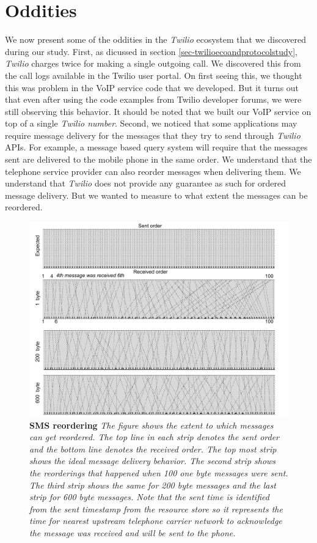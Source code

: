 \section{Oddities}
\label{sec-oddities}

We now present some of the oddities in the \textit{Twilio} ecosystem that we discovered during our study. First, as dicussed in section \ref{sec-twilioecoandprotocolstudy}, \textit{Twilio} charges twice for making a single outgoing call. We discovered this from the call logs available in the Twilio user portal. On first seeing this, we thought this was problem in the VoIP service code that we developed. But it turns out that even after using the code examples from Twilio developer forums, we were still observing this behavior. It should be noted that we built our VoIP service on top of a single \textit{Twilio number}. Second, we noticed that some applications may require  message delivery for the messages that they try to send through \textit{Twilio} APIs. For example, a message based query system will require that the messages sent are delivered to the mobile phone in the same order. We understand that the telephone service provider can also reorder messages when delivering them. We understand that \textit{Twilio} does not provide any guarantee as such for ordered message delivery. But we wanted to measure to what extent the messages can be reordered. 

\begin{figure}[t!] \centering
\includegraphics[width=\textwidth]{figs/reordering.pdf}
\caption{\label{reordering}\textbf{SMS reordering} {\footnotesize\textit{
The figure shows the extent to which messages can get reordered. The top line in each strip denotes the sent order and the bottom line denotes the received order. The top most strip shows the ideal message delivery behavior. The second strip shows the reorderings that happened when 100 one byte messages were sent. The third strip shows the same for 200 byte messages and the last strip for 600 byte messages. Note that the sent time is identified from the \textit{sent timestamp} from the resource store so it represents the time for nearest upstream telephone carrier network to acknowledge the message was received and will be sent to the phone. 
}}}
\end{figure}

